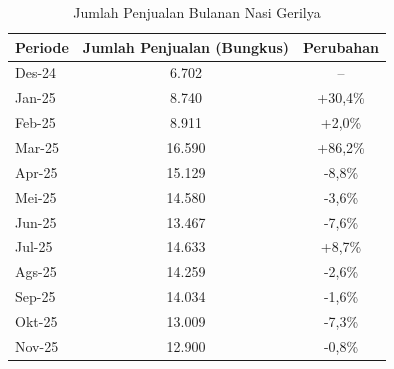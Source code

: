 \begin{table}[!htbp]
    \centering
    \caption{Jumlah Penjualan Bulanan Nasi Gerilya}
    \label{tab:jumlah_penjualan_bungkus_grabfood}
    \begin{tabular}{|l|c|c|}
        \toprule
        \textbf{Periode} & \textbf{Jumlah Penjualan (Bungkus)} & \textbf{Perubahan} \\ \hline
        \midrule
        Des-24           & 6.702                               & --                 \\ \hline
        Jan-25           & 8.740                               & +30,4\%            \\ \hline
        Feb-25           & 8.911                               & +2,0\%             \\ \hline
        Mar-25           & 16.590                              & +86,2\%            \\ \hline
        Apr-25           & 15.129                              & -8,8\%             \\ \hline
        Mei-25           & 14.580                              & -3,6\%             \\ \hline
        Jun-25           & 13.467                              & -7,6\%             \\ \hline
        Jul-25           & 14.633                              & +8,7\%             \\ \hline
        Ags-25           & 14.259                              & -2,6\%             \\ \hline
        Sep-25           & 14.034                              & -1,6\%             \\ \hline
        Okt-25           & 13.009                              & -7,3\%             \\ \hline
        Nov-25           & 12.900                              & -0,8\%             \\ \hline
        \bottomrule
    \end{tabular}
\end{table}

